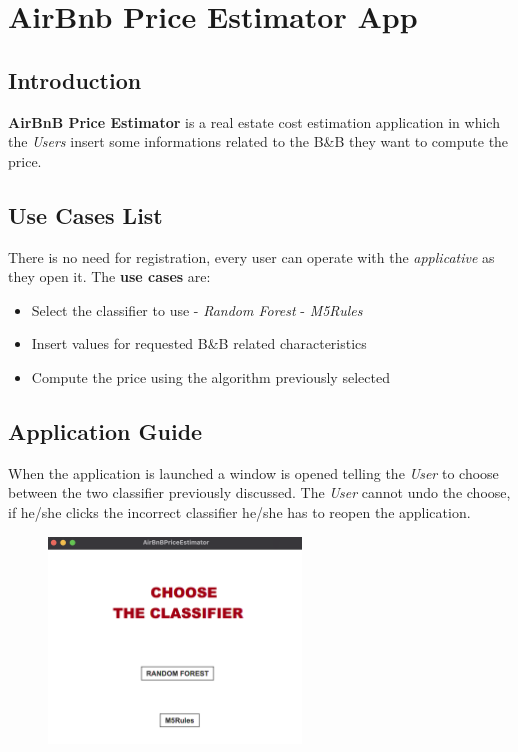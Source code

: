 \section{AirBnb Price Estimator App}

\subsection{Introduction}
\textbf{AirBnB Price Estimator} is a real estate cost estimation application in which the \textit{Users} insert some informations related to the B\&B they want to compute the price.

\subsection{Use Cases List}
There is no need for registration, every user can operate with the \textit{applicative} as they open it. The \textbf{use cases} are:

\begin{itemize}
	\item Select the classifier to use
		\subitem - \textit{Random Forest}
		\subitem - \textit{M5Rules}
	\item Insert values for requested B\&B related characteristics
	\item Compute the price using the algorithm previously selected
\end{itemize}

\subsection{Application Guide}
When the application is launched a window is opened telling the \textit{User} to choose between the two classifier previously discussed. The \textit{User} cannot undo the choose, if he/she clicks the incorrect classifier he/she has to reopen the application.

\begin{figure}[H]
	\centering
	\includegraphics[width=0.6\textwidth]{img/app.png}  
\end{figure}

